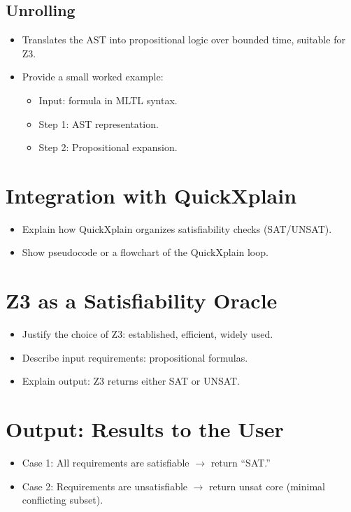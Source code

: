 \documentclass[12pt]{report}
\begin{document}
\subsection{Unrolling}
\begin{itemize}
  \item Translates the AST into propositional logic over bounded time, suitable for Z3.
  \item Provide a small worked example:
    \begin{itemize}
      \item Input: formula in MLTL syntax.
      \item Step 1: AST representation.
      \item Step 2: Propositional expansion.
    \end{itemize}
\end{itemize}

\section{Integration with QuickXplain}
\begin{itemize}
  \item Explain how QuickXplain organizes satisfiability checks (SAT/UNSAT).
  \item Show pseudocode or a flowchart of the QuickXplain loop.
\end{itemize}

\section{Z3 as a Satisfiability Oracle}
\begin{itemize}
  \item Justify the choice of Z3: established, efficient, widely used.
  \item Describe input requirements: propositional formulas.
  \item Explain output: Z3 returns either SAT or UNSAT.
\end{itemize}

\section{Output: Results to the User}
\begin{itemize}
  \item Case 1: All requirements are satisfiable $\rightarrow$ return ``SAT.''
  \item Case 2: Requirements are unsatisfiable $\rightarrow$ return unsat core (minimal conflicting subset).
\end{itemize}
\end{document}
